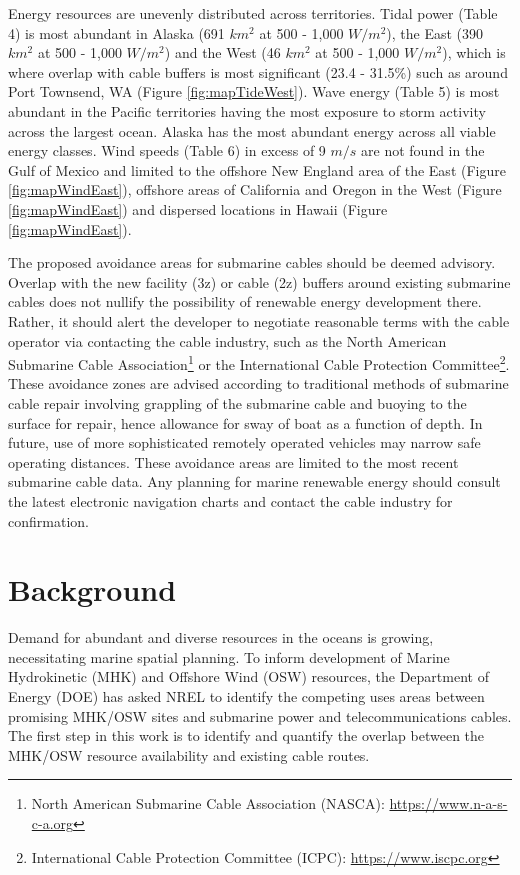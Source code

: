 \documentclass[]{article}
\let\rmarkdownfootnote\footnote%
\def\footnote{\protect\rmarkdownfootnote}
\begin{document}
Energy resources are unevenly distributed across territories. Tidal
power (Table 4) is most abundant in Alaska (691 \(km^2\) at 500 - 1,000
\(W/m^2\)), the East (390 \(km^2\) at 500 - 1,000 \(W/m^2\)) and the
West (46 \(km^2\) at 500 - 1,000 \(W/m^2\)), which is where overlap with
cable buffers is most significant (23.4 - 31.5\%) such as around Port
Townsend, WA (Figure \ref{fig:mapTideWest}). Wave energy (Table 5) is
most abundant in the Pacific territories having the most exposure to
storm activity across the largest ocean. Alaska has the most abundant
energy across all viable energy classes. Wind speeds (Table 6) in excess
of 9 \(m/s\) are not found in the Gulf of Mexico and limited to the
offshore New England area of the East (Figure \ref{fig:mapWindEast}),
offshore areas of California and Oregon in the West (Figure
\ref{fig:mapWindEast}) and dispersed locations in Hawaii (Figure
\ref{fig:mapWindEast}).

The proposed avoidance areas for submarine cables should be deemed
advisory. Overlap with the new facility (3z) or cable (2z) buffers
around existing submarine cables does not nullify the possibility of
renewable energy development there. Rather, it should alert the
developer to negotiate reasonable terms with the cable operator via
contacting the cable industry, such as the North American Submarine
Cable Association\footnote{North American Submarine Cable Association
  (NASCA): \url{https://www.n-a-s-c-a.org}} or the International Cable
Protection Committee\footnote{International Cable Protection Committee
  (ICPC): \url{https://www.iscpc.org}}. These avoidance zones are
advised according to traditional methods of submarine cable repair
involving grappling of the submarine cable and buoying to the surface
for repair, hence allowance for sway of boat as a function of depth. In
future, use of more sophisticated remotely operated vehicles may narrow
safe operating distances. These avoidance areas are limited to the most
recent submarine cable data. Any planning for marine renewable energy
should consult the latest electronic navigation charts and contact the
cable industry for confirmation.

\hypertarget{background}{%
\section{Background}\label{background}}

Demand for abundant and diverse resources in the oceans is growing,
necessitating marine spatial planning. To inform development of Marine
Hydrokinetic (MHK) and Offshore Wind (OSW) resources, the Department of
Energy (DOE) has asked NREL to identify the competing uses areas between
promising MHK/OSW sites and submarine power and telecommunications
cables. The first step in this work is to identify and quantify the
overlap between the MHK/OSW resource availability and existing cable
routes.
\end{document}
